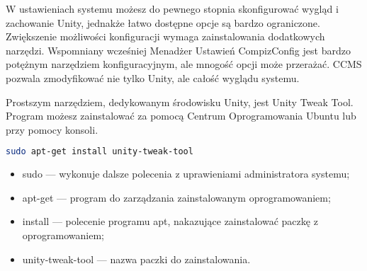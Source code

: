 W \textcolor{ubuntu_orange}{ustawieniach systemu} możesz do pewnego stopnia skonfigurować wygląd i zachowanie Unity, jednakże łatwo dostępne opcje są bardzo ograniczone. Zwiększenie możliwości konfiguracji wymaga zainstalowania dodatkowych narzędzi. Wspomniany wcześniej Menadżer Ustawień CompizConfig jest bardzo potężnym narzędziem konfiguracyjnym, ale mnogość opcji może przerażać. CCMS pozwala zmodyfikować nie tylko Unity, ale całość wyglądu systemu.

Prostszym narzędziem, dedykowanym środowisku Unity, jest \textcolor{ubuntu_orange}{Unity Tweak Tool}. Program możesz zainstalować za pomocą Centrum Oprogramowania Ubuntu lub przy pomocy konsoli.
\begin{lstlisting}[language=bash]
sudo apt-get install unity-tweak-tool
\end{lstlisting}
\begin{itemize}
\item \textcolor{ubuntu_orange}{sudo} --- wykonuje dalsze polecenia z uprawieniami administratora systemu;
\item \textcolor{ubuntu_orange}{apt-get} --- program do zarządzania zainstalowanym oprogramowaniem;
\item \textcolor{ubuntu_orange}{install} --- polecenie programu apt, nakazujące zainstalować paczkę z oprogramowaniem;
\item \textcolor{ubuntu_orange}{unity-tweak-tool} --- nazwa paczki do zainstalowania.
\end{itemize}
